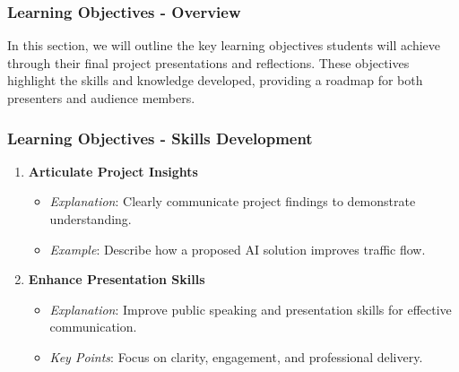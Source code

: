 \documentclass{beamer}
\begin{document}
\begin{frame}[fragile]
    \frametitle{Learning Objectives - Overview}
    In this section, we will outline the key learning objectives students will achieve through their final project presentations and reflections. 
    These objectives highlight the skills and knowledge developed, providing a roadmap for both presenters and audience members.
\end{frame}

\begin{frame}[fragile]
    \frametitle{Learning Objectives - Skills Development}
    \begin{enumerate}
        \item \textbf{Articulate Project Insights}
            \begin{itemize}
                \item \textit{Explanation}: Clearly communicate project findings to demonstrate understanding.
                \item \textit{Example}: Describe how a proposed AI solution improves traffic flow.
            \end{itemize}
        
        \item \textbf{Enhance Presentation Skills}
            \begin{itemize}
                \item \textit{Explanation}: Improve public speaking and presentation skills for effective communication.
                \item \textit{Key Points}: Focus on clarity, engagement, and professional delivery.
            \end{itemize}
    \end{enumerate}
\end{frame}
\end{document}
